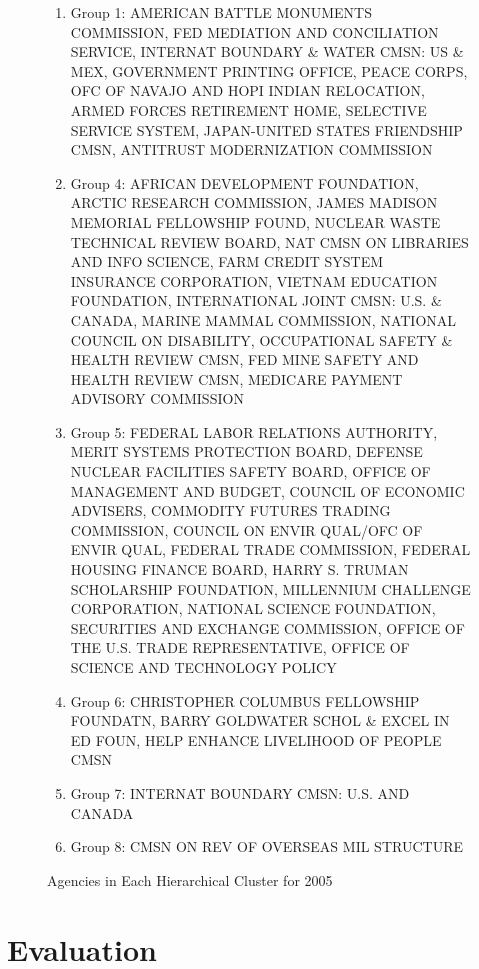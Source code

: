 \documentclass{article}
\begin{document}
    \begin{center}
        \begin{figure}
            \begin{enumerate}
                \item Group 1: AMERICAN BATTLE MONUMENTS COMMISSION, FED MEDIATION AND CONCILIATION SERVICE, INTERNAT BOUNDARY \& WATER CMSN: US \& MEX, GOVERNMENT PRINTING OFFICE, PEACE CORPS, OFC OF NAVAJO AND HOPI INDIAN RELOCATION, ARMED FORCES RETIREMENT HOME, SELECTIVE SERVICE SYSTEM, JAPAN-UNITED STATES FRIENDSHIP CMSN, ANTITRUST MODERNIZATION COMMISSION
                \item Group 4: AFRICAN DEVELOPMENT FOUNDATION, ARCTIC RESEARCH COMMISSION, JAMES MADISON MEMORIAL FELLOWSHIP FOUND, NUCLEAR WASTE TECHNICAL REVIEW BOARD, NAT CMSN ON LIBRARIES AND INFO SCIENCE, FARM CREDIT SYSTEM INSURANCE CORPORATION, VIETNAM EDUCATION FOUNDATION, INTERNATIONAL JOINT CMSN: U.S. \& CANADA, MARINE MAMMAL COMMISSION, NATIONAL COUNCIL ON DISABILITY, OCCUPATIONAL SAFETY \& HEALTH REVIEW CMSN, FED MINE SAFETY AND HEALTH REVIEW CMSN, MEDICARE PAYMENT ADVISORY COMMISSION
                \item Group 5: FEDERAL LABOR RELATIONS AUTHORITY, MERIT SYSTEMS PROTECTION BOARD, DEFENSE NUCLEAR FACILITIES SAFETY BOARD, OFFICE OF MANAGEMENT AND BUDGET, COUNCIL OF ECONOMIC ADVISERS, COMMODITY FUTURES TRADING COMMISSION, COUNCIL ON ENVIR QUAL/OFC OF ENVIR QUAL, FEDERAL TRADE COMMISSION, FEDERAL HOUSING FINANCE BOARD, HARRY S. TRUMAN SCHOLARSHIP FOUNDATION, MILLENNIUM CHALLENGE CORPORATION, NATIONAL SCIENCE FOUNDATION, SECURITIES AND EXCHANGE COMMISSION, OFFICE OF THE U.S. TRADE REPRESENTATIVE, OFFICE OF SCIENCE AND TECHNOLOGY POLICY
                \item Group 6: CHRISTOPHER COLUMBUS FELLOWSHIP FOUNDATN, BARRY GOLDWATER SCHOL \& EXCEL IN ED FOUN, HELP ENHANCE LIVELIHOOD OF PEOPLE CMSN
                \item Group 7: INTERNAT BOUNDARY CMSN: U.S. AND CANADA
                \item Group 8: CMSN ON REV OF OVERSEAS MIL STRUCTURE
            \end{enumerate}
            \caption{Agencies in Each Hierarchical Cluster for 2005}
            \label{tab:3}
        \end{figure}
    \end{center}

\section{Evaluation}
\end{document}

